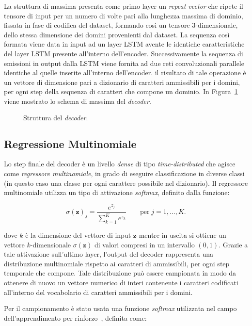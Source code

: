 La struttura di massima presenta come primo layer un \textit{repeat vector} che ripete il tensore di input per un numero di volte pari alla lunghezza massima di dominio, fissata in fase di codifica del dataset, formando così un tensore 3-dimensionale, dello stessa dimensione dei domini provenienti dal dataset. La sequenza così formata viene data in input ad un layer LSTM avente le identiche caratteristiche del layer LSTM presente all'interno dell'encoder. Successivamente la sequenza di emissioni in output dalla LSTM viene fornita ad due reti convoluzionali parallele identiche al quelle inserite all'interno dell'encoder. il risultato di tale operazione è un vettore di dimensione pari a dizionario di caratteri ammissibili per i domini, per ogni step della sequenza di caratteri che compone un dominio. In Figura~\ref{fig:decoder} viene mostrato lo schema di massima del \textit{decoder}.

\begin{figure}[p]
    \centering
	
	\caption{Struttura del \textit{decoder}.
\label{fig:decoder}}
\end{figure}

\subsection{Regressione Multinomiale}
Lo step finale del decoder è un livello \textit{dense} di tipo \textit{time-distributed} che agisce come \textit{regressore multinomiale}, in grado di eseguire classificazione in diverse classi (in questo caso una classe per ogni carattere possibile nel dizionario). Il regressore multinomiale utilizza un tipo di attivazione \textit{softmax}, definito dalla funzione:

\[\sigma(\mathbf{z})_j = \frac{e^{z_j}}{\sum_{k=1}^K e^{z_k}}\qquad  \text{per}\; j=1,\ldots,K. \] 

dove $k$ è la dimensione del vettore di input $\mathbf{z}$ mentre in uscita si ottiene un vettore $k$-dimensionale $\sigma(\mathbf{z})$ di valori compresi in un intervallo $\left(0,1\right)$. Grazie a tale attivazione sull'ultimo layer, l'output del decoder rappresenta una distribuzione multinomiale rispetto ai caratteri di ammissibili, per ogni step temporale che compone. 
Tale distribuzione può essere campionata in modo da ottenere di nuovo un vettore numerico di interi contenente i caratteri codificati all'interno del vocabolario di caratteri ammissibili per i domini. 

Per il campionamento è stato usata una funzione \textit{softmax} utilizzata nel campo dell'apprendimento per rinforzo~\cite{reinflearning}, definita come: 

